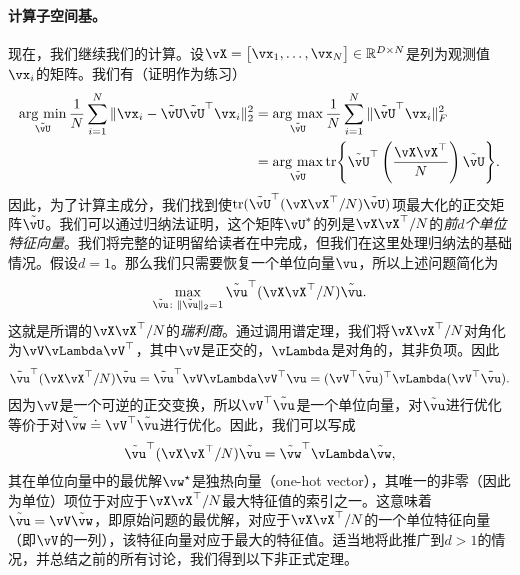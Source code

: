 \documentclass[../../book-main_zh.tex]{subfiles}
\begin{document}
\paragraph{计算子空间基。}
现在，我们继续我们的计算。设\(\vX = \mat{\vx_{1}, \dots, \vx_{N}} \in \R^{D \times N}\)是列为观测值\(\vx_{i}\)的矩阵。我们有（证明作为练习）
\begin{align}
    \argmin_{\tilde{\vU}}\frac{1}{N}\sum_{i = 1}^{N}\norm{\vx_{i} - \tilde{\vU}\tilde{\vU}^{\top}\vx_{i}}_{2}^{2}
    &= \argmax_{\tilde{\vU}}\frac{1}{N}\sum_{i = 1}^{N}\norm{\tilde{\vU}^{\top}\vx_{i}}_{F}^{2} \\ 
    &= \argmax_{\tilde{\vU}}\tr\rc{\tilde{\vU}^{\top}\bp{\frac{\vX\vX^{\top}}{N}}\tilde{\vU}}.
\end{align}
因此，为了计算主成分，我们找到使\(\tr(\tilde{\vU}^{\top}(\vX\vX^{\top}/N)\tilde{\vU})\)项最大化的正交矩阵\(\tilde{\vU}\)。我们可以通过归纳法证明，这个矩阵\(\vU^{\ast}\)的列是\(\vX\vX^{\top}/N\)的\textit{前\(d\)个单位特征向量}。我们将完整的证明留给读者在中完成，但我们在这里处理归纳法的基础情况。假设\(d = 1\)。那么我们只需要恢复一个单位向量\(\vu\)，所以上述问题简化为
\begin{equation}
    \max_{\tilde{\vu} \colon \norm{\tilde{\vu}}_{2} = 1} \tilde{\vu}^{\top}(\vX\vX^{\top}/N)\tilde{\vu}.
\end{equation}
这就是所谓的\(\vX\vX^{\top}/N\)的\textit{瑞利商}。通过调用谱定理，我们将\(\vX\vX^{\top}/N\)对角化为\(\vV\vLambda\vV^{\top}\)，其中\(\vV\)是正交的，\(\vLambda\)是对角的，其非负项。因此
\begin{equation}
    \tilde{\vu}^{\top}(\vX\vX^{\top}/N)\tilde{\vu} = \tilde{\vu}^{\top}\vV\vLambda\vV^{\top}\vu = (\vV^{\top}\tilde{\vu})^{\top}\vLambda(\vV^{\top}\tilde{\vu}).
\end{equation}
因为\(\vV\)是一个可逆的正交变换，所以\(\vV^{\top}\tilde{\vu}\)是一个单位向量，对\(\tilde{\vu}\)进行优化等价于对\(\tilde{\vw} \doteq \vV^{\top}\tilde{\vu}\)进行优化。因此，我们可以写成
\begin{equation}
    \tilde{\vu}^{\top}(\vX\vX^{\top}/N)\tilde{\vu} = \tilde{\vw}^{\top}\vLambda\tilde{\vw},
\end{equation}
其在单位向量中的最优解\(\vw^{\star}\)是独热向量（one-hot vector），其唯一的非零（因此为单位）项位于对应于\(\vX\vX^{\top}/N\)最大特征值的索引之一。这意味着\(\tilde{\vu} = \vV\tilde{\vw}\)，即原始问题的最优解，对应于\(\vX\vX^{\top}/N\)的一个单位特征向量（即\(\vV\)的一列），该特征向量对应于最大的特征值。适当地将此推广到\(d > 1\)的情况，并总结之前的所有讨论，我们得到以下非正式定理。
\end{document}
